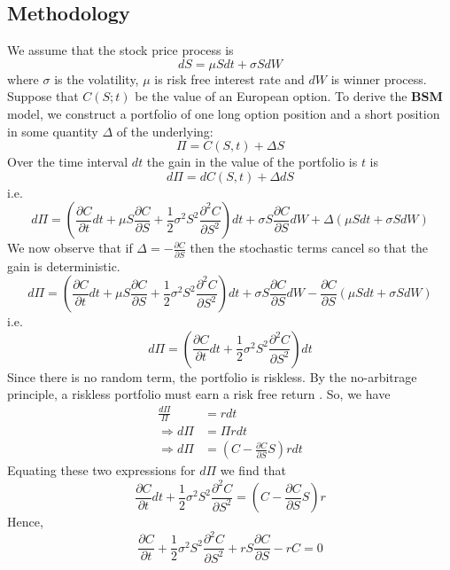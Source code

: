 \subsection{ Methodology}
\noindent We assume that the stock price process is
\begin{equation}
	dS=\mu S d t+\sigma SdW 
	\label{eq:gmb}
\end{equation}
where $\sigma$ is the volatility, $\mu$ is risk free interest rate and $dW$ is winner process.\\[2mm]
Suppose that $C(S;t)$ be the value of an European option. To derive the {\bf BSM} model, we construct a portfolio of one long option position and a short position in some
quantity $\Delta$ of the underlying:
$$
\Pi=C(S, t)+\Delta S
$$
Over the time interval $d t$ the gain in the value of the portfolio is $t$ is
$$
d \Pi=d C(S, t)+\Delta d S
$$
i.e.
$$
d \Pi=\left(\frac{\partial C}{\partial t} d t+\mu S \frac{\partial C}{\partial S}+\frac{1}{2} \sigma^{2} S^{2} \frac{\partial^{2} C}{\partial S^{2}}\right) d t+\sigma S \frac{\partial C}{\partial S} d W+\Delta(\mu S d t+\sigma S d W)
$$
We now observe that if $\Delta=-\frac{\partial C}{\partial S}$ then the stochastic terms cancel so that the gain is deterministic.
$$
d \Pi=\left(\frac{\partial C}{\partial t} d t+\mu S \frac{\partial C}{\partial S}+\frac{1}{2} \sigma^{2} S^{2} \frac{\partial^{2} C}{\partial S^{2}}\right) d t+\sigma S \frac{\partial C}{\partial S} d W-\frac{\partial C}{\partial S}(\mu S d t+\sigma S d W)
$$
i.e.
$$
d \Pi=\left(\frac{\partial C}{\partial t} d t+\frac{1}{2} \sigma^{2} S^{2} \frac{\partial^{2} C}{\partial S^{2}}\right) d t
$$
Since there is no random term, the portfolio is riskless. By the no-arbitrage principle, a riskless portfolio must earn a risk free return . So, we have
$$
\begin{aligned}
	\frac{d \Pi}{\Pi} &=r d t \\
	\Rightarrow d \Pi &=\Pi r d t \\
	\Rightarrow d \Pi &=\left(C-\frac{\partial C}{\partial S} S\right) r d t
\end{aligned}
$$
Equating these two expressions for $d \Pi$ we find that
$$
\frac{\partial C}{\partial t} d t+\frac{1}{2} \sigma^{2} S^{2} \frac{\partial^{2} C}{\partial S^{2}}=\left(C-\frac{\partial C}{\partial S} S\right) r
$$
Hence,\\
	\begin{equation}
		\frac{\partial C}{\partial t}+\frac{1}{2} \sigma^{2} S^{2} \frac{\partial^{2} C}{\partial S^{2}}+r S \frac{\partial C}{\partial S}-r C=0
		\label{eq:bsm}
	\end{equation}


